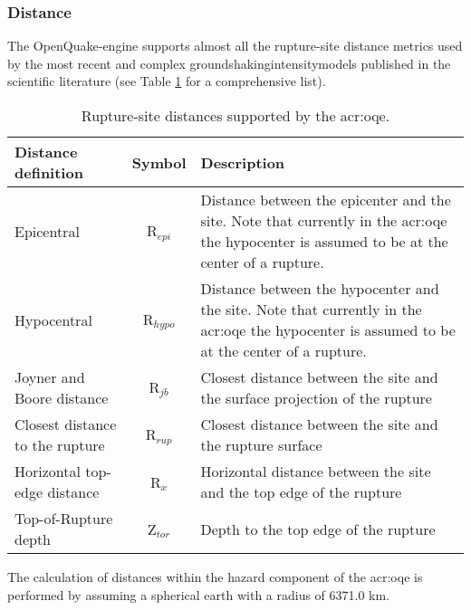 \subsubsection{Distance}
%
The OpenQuake-engine supports almost all the rupture-site 
distance metrics used by the most recent and complex 
\glspl{groundshakingintensitymodel} published in the scientific 
literature (see Table \ref{tab:distances} for a comprehensive list).
\begin{table}[!t]
\centering
\caption{Rupture-site distances supported by the \gls{acr:oqe}.}
\begin{tabular}{|p{4.5cm}cp{7.5cm}|}
\hline
\rowcolor{anti-flashwhite}
\bf{Distance definition} & \bf{Symbol} & \bf{Description} \\
\hline 
Epicentral & R$_{epi}$ & Distance between the epicenter and the site. 
                         Note that currently in the \gls{acr:oqe} the 
                         hypocenter is assumed to be at the center of 
                         a rupture.\\
Hypocentral & R$_{hypo}$ & Distance between the hypocenter and the site. 
                           Note that currently in the \gls{acr:oqe} the 
                           hypocenter is assumed to be at the center of 
                           a rupture.\\
Joyner and Boore distance & R$_{jb}$ & Closest distance between the site and 
                                       the surface projection of the rupture \\
Closest distance to the rupture & R$_{rup}$ & Closest distance between 
                                              the site and the rupture 
                                              surface \\
Horizontal top-edge distance & R$_{x}$ & Horizontal distance between the site 
                                         and the top edge of the rupture \\
Top-of-Rupture depth & Z$_{tor}$ & Depth to the top edge of the rupture \\
\hline
\end{tabular}
\label{tab:distances}
\end{table}
The calculation of distances within the hazard component of the \gls{acr:oqe} 
is performed by assuming a spherical earth with a radius of 6371.0 km. 

